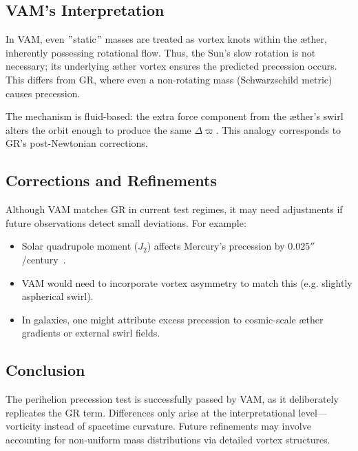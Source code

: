 \subsection*{VAM's Interpretation}
In VAM, even \("\)static\("\) masses are treated as vortex knots within the æther, inherently possessing rotational flow. Thus, the Sun's slow rotation is not necessary; its underlying æther vortex ensures the predicted precession occurs. This differs from GR, where even a non-rotating mass (Schwarzschild metric) causes precession.

The mechanism is fluid-based: the extra force component from the æther's swirl alters the orbit enough to produce the same $\Delta \varpi$. This analogy corresponds to GR's post-Newtonian corrections.

\subsection*{Corrections and Refinements}
Although VAM matches GR in current test regimes, it may need adjustments if future observations detect small deviations. For example:
\begin{itemize}
    \item Solar quadrupole moment ($J_2$) affects Mercury's precession by $0.025''$/century~\cite{sereno2006solar}.
    \item VAM would need to incorporate vortex asymmetry to match this (e.g. slightly aspherical swirl).
    \item In galaxies, one might attribute excess precession to cosmic-scale æther gradients or external swirl fields.
\end{itemize}

\subsection*{Conclusion}
The perihelion precession test is successfully passed by VAM, as it deliberately replicates the GR term. Differences only arise at the interpretational level—vorticity instead of spacetime curvature. Future refinements may involve accounting for non-uniform mass distributions via detailed vortex structures.